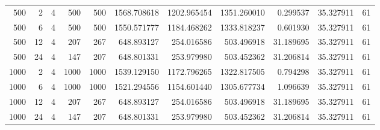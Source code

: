 \begin{table}
\begin{tabular}{rrrrrrrrrrr}
500 & 2 & 4 & 500 & 500 & 1568.708618 & 1202.965454 & 1351.260010 & 0.299537 & 35.327911 & 61 \\
500 & 6 & 4 & 500 & 500 & 1550.571777 & 1184.468262 & 1333.818237 & 0.601930 & 35.327911 & 61 \\
500 & 12 & 4 & 207 & 267 & 648.893127 & 254.016586 & 503.496918 & 31.189695 & 35.327911 & 61 \\
500 & 24 & 4 & 147 & 207 & 648.801331 & 253.979980 & 503.452362 & 31.206814 & 35.327911 & 61 \\
1000 & 2 & 4 & 1000 & 1000 & 1539.129150 & 1172.796265 & 1322.817505 & 0.794298 & 35.327911 & 61 \\
1000 & 6 & 4 & 1000 & 1000 & 1521.294556 & 1154.601440 & 1305.677734 & 1.096639 & 35.327911 & 61 \\
1000 & 12 & 4 & 207 & 267 & 648.893127 & 254.016586 & 503.496918 & 31.189695 & 35.327911 & 61 \\
1000 & 24 & 4 & 147 & 207 & 648.801331 & 253.979980 & 503.452362 & 31.206814 & 35.327911 & 61 \\
\bottomrule
\end{tabular}
\end{table}

